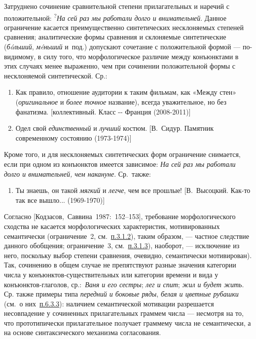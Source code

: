Затруднено сочинение сравнительной степени прилагательных и наречий с
положительной: \textsuperscript{?}\textit{На сей раз мы работали долго и
внимательней}. Данное ограничение касается преимущественно синтетических
несклоняемых степеней сравнения; аналитические формы сравнения и
склоняемые синтетические (\textit{бóльший}, \textit{мéньший} и~под.)
допускают сочетание с положительной формой --- по-видимому, в силу того,
что морфологическое различие между конъюнктами в этих случаях менее
выраженно, чем при сочинении положительной формы с несклоняемой
синтетической. Ср.:

\begin{enumerate}
\def\labelenumi{(\arabic{enumi})}
\setcounter{enumi}{6}
\item
  Как правило, отношение аудитории к таким фильмам, как «Между стен»
  (\textit{оригинальное} и \textit{более точное} название), всегда
  уважительное, но без фанатизма. {[}коллективный. Класс -\/- Франция
  (2008-2011){]}
\item
  Одел свой \textit{единственный} и \textit{лучший} костюм. {[}В.~Сидур.
  Памятник современному состоянию (1973-1974){]}
\end{enumerate}

Кроме того, и для несклоняемых синтетических форм ограничение снимается,
если при одном из конъюнктов имеется зависимое: \textit{На сей раз мы
работали долго и внимательней, чем накануне}. Ср.~также:

\begin{enumerate}
\def\labelenumi{(\arabic{enumi})}
\setcounter{enumi}{8}
\item
  Ты знаешь, он такой \textit{мягкий} и \textit{легче}, чем все прошлые!
  {[}В.~Высоцкий. Как-то так все вышло... (1969-1970){]}
\end{enumerate}

Согласно {[}Кодзасов,~Саввина~1987:~152--153{]}, требование
морфологического сходства не касается морфологических характеристик,
мотивированных семантически (ограничение~2, см.~\underline{п.3.1.2}),
таким образом, --- частное следствие данного обобщения; ограничение~3,
см.~\underline{п.3.1.3}), наоборот, --- исключение из него, поскольку
выбор степени сравнения, очевидно, семантически мотивирован). Так,
сочинению в общем случае не препятствуют разные значения категории числа
у конъюнктов-существительных или категории времени и вида у
конъюнктов-глаголов, ср.:~\textit{Ваня и его сестры}; \textit{лег и спит};
\textit{жил и будет жить}. Ср. также примеры типа \textit{передний и боковые
ряды}, \textit{белая и цветные рубашки} (см.~о них~\underline{п.6.3.3}):
наличием семантической мотивации разрешается несовпадение у сочиненных
прилагательных граммем числа --- несмотря на то, что прототипически
прилагательное получает граммему числа не семантически, а на основе
синтаксического механизма согласования.

